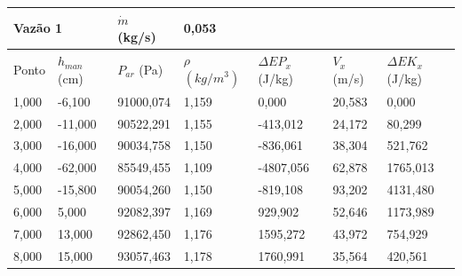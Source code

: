 \documentclass[12pt, twoside, a4]{article}
\begin{document}
\begin{table}[H]
    \begin{tabular}{|ll|l|l|lll}
    \cline{1-4}
    \multicolumn{2}{|l|}{Vazão 1}         & $ \dot{m} $ (kg/s) & 0,053 &                                &                             &                               \\ \hline
    \multicolumn{1}{|l|}{Ponto} &
      $ h_{man} $ (cm) &
      $P_{ar}$ (Pa) &
      $ \rho $ $(kg / m^3)$ &
      \multicolumn{1}{l|}{$ \Delta EP_x $ (J/kg)} &
      \multicolumn{1}{l|}{$V_x$ (m/s)} &
      \multicolumn{1}{l|}{$ \Delta EK_x $ (J/kg)} \\ \hline
    \multicolumn{1}{|l|}{1,000} & -6,100  & 91000,074          & 1,159 & \multicolumn{1}{l|}{0,000}     & \multicolumn{1}{l|}{20,583} & \multicolumn{1}{l|}{0,000}    \\ \hline
    \multicolumn{1}{|l|}{2,000} & -11,000 & 90522,291          & 1,155 & \multicolumn{1}{l|}{-413,012}  & \multicolumn{1}{l|}{24,172} & \multicolumn{1}{l|}{80,299}   \\ \hline
    \multicolumn{1}{|l|}{3,000} & -16,000 & 90034,758          & 1,150 & \multicolumn{1}{l|}{-836,061}  & \multicolumn{1}{l|}{38,304} & \multicolumn{1}{l|}{521,762}  \\ \hline
    \multicolumn{1}{|l|}{4,000} & -62,000 & 85549,455          & 1,109 & \multicolumn{1}{l|}{-4807,056} & \multicolumn{1}{l|}{62,878} & \multicolumn{1}{l|}{1765,013} \\ \hline
    \multicolumn{1}{|l|}{5,000} & -15,800 & 90054,260          & 1,150 & \multicolumn{1}{l|}{-819,108}  & \multicolumn{1}{l|}{93,202} & \multicolumn{1}{l|}{4131,480} \\ \hline
    \multicolumn{1}{|l|}{6,000} & 5,000   & 92082,397          & 1,169 & \multicolumn{1}{l|}{929,902}   & \multicolumn{1}{l|}{52,646} & \multicolumn{1}{l|}{1173,989} \\ \hline
    \multicolumn{1}{|l|}{7,000} & 13,000  & 92862,450          & 1,176 & \multicolumn{1}{l|}{1595,272}  & \multicolumn{1}{l|}{43,972} & \multicolumn{1}{l|}{754,929}  \\ \hline
    \multicolumn{1}{|l|}{8,000} & 15,000  & 93057,463          & 1,178 & \multicolumn{1}{l|}{1760,991}  & \multicolumn{1}{l|}{35,564} & \multicolumn{1}{l|}{420,561}  \\ \hline
    \end{tabular}
\end{table}
\end{document}
